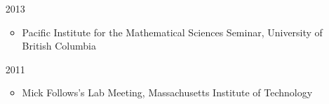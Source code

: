 \documentclass[12pt]{article}
\begin{document}
\begin{itemize}


     \item [2013]
       \begin{itemize}
       \item Pacific Institute for the Mathematical Sciences Seminar, University of British Columbia
       \end{itemize}


    \item [2011]
      \begin{itemize}
      \item Mick Follows's Lab Meeting, Massachusetts Institute of Technology
      \end{itemize}


\end{itemize}
\end{document}
